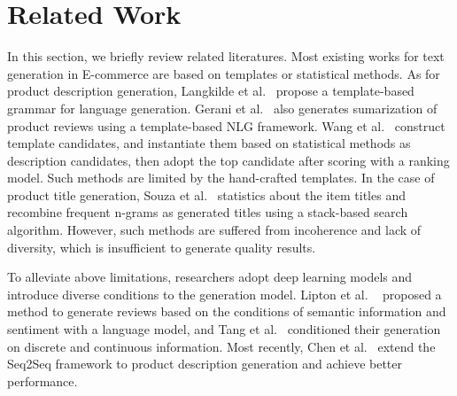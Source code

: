 \section{Related Work}
In this section, we briefly review related literatures.
%
Most existing works for text generation in E-commerce 
are based on templates or statistical methods.
As for product description generation, 
Langkilde et al.~\cite{langkilde1998generation} propose a 
template-based grammar for language generation.
Gerani et al.~\cite{gerani2014abstractive} also generates sumarization of product reviews
using a template-based NLG framework.
Wang et al.~\cite{wang2017statistical} construct template candidates, and instantiate them  
based on statistical methods as description candidates,
then adopt the top candidate after scoring with a ranking model. 
Such methods are limited by the hand-crafted templates.
In the case of product title generation, 
Souza et al.~\cite{de2018generating} statistics about the item titles and
recombine frequent n-grams as generated titles using a stack-based search algorithm. 
However, such methods are suffered from incoherence and lack of diversity, which is insufficient to generate quality results.

To alleviate above limitations, researchers adopt deep learning models 
and introduce diverse conditions to the generation model. 
Lipton et al. ~\cite{lipton2015capturing} proposed a method to generate reviews 
based on the conditions of semantic information and sentiment with a language model, 
and Tang et al.~\cite{tang2016context} 
conditioned their generation on discrete and continuous information. 
Most recently, Chen et al.~\cite{ChenLZYZ019} extend the Seq2Seq framework
to product description generation and achieve better performance. 


